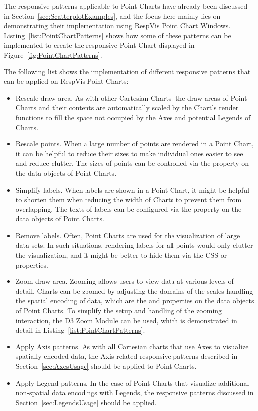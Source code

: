 The responsive patterns applicable to Point Charts have already been discussed in Section~\ref{sec:ScatterplotExamples}, and the focus here mainly lies on demonstrating their implementation using RespVis Point Chart Windows.
Listing~\ref{list:PointChartPatterns} shows how some of these patterns can be implemented to create the responsive Point Chart displayed in Figure~\ref{fig:PointChartPatterns}.

The following list shows the implementation of different responsive patterns that can be applied on RespVis Point Charts:

\begin{itemize}

\item
Rescale draw area.
As with other Cartesian Charts, the draw areas of Point Charts and their contents are automatically scaled by the Chart's render functions to fill the space not occupied by the Axes and potential Legends of Charts.

\item
Rescale points.
When a large number of points are rendered in a Point Chart, it can be helpful to reduce their sizes to make individual ones easier to see and reduce clutter.
The sizes of points can be controlled via the  property on the data objects of Point Charts.

\item
Simplify labels.
When labels are shown in a Point Chart, it might be helpful to shorten them when reducing the width of Charts to prevent them from overlapping.
The texts of labels can be configured via the  property on the data objects of Point Charts.

\item
Remove labels.
Often, Point Charts are used for the visualization of large data sets.
In such situations, rendering labels for all points would only clutter the visualization, and it might be better to hide them via the CSS  or  properties. 

\item
Zoom draw area.
Zooming allows users to view data at various levels of detail.
Charts can be zoomed by adjusting the domains of the scales handling the spatial encoding of data, which are the  and  properties on the data objects of Point Charts.
To simplify the setup and handling of the zooming interaction, the D3 Zoom Module \parencite{D3Zoom} can be used, which is demonstrated in detail in Listing~\ref{list:PointChartPatterns}.

\item
Apply Axis patterns.
As with all Cartesian charts that use Axes to visualize spatially-encoded data, the Axis-related responsive patterns described in Section~\ref{sec:AxesUsage} should be applied to Point Charts.

\item
Apply Legend patterns.
In the case of Point Charts that visualize additional non-spatial data encodings with Legends, the responsive patterns discussed in Section~\ref{sec:LegendsUsage} should be applied.  

\end{itemize} 

